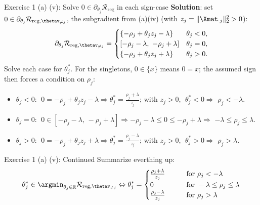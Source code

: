 \documentclass[aspectratio=169]{beamer}
\begin{document}
\begin{frame}{Exercise 1 (a) (v): Solve $0 \in \partial_{\theta_j}\mathcal{R}_{\text{reg}}$ in each sign-case}
	\small
	\textbf{Solution}: set $0 \in \partial_{\theta_j}\mathcal{R}_{\text{reg},\thetav_{\neq j}}$, the subgradient from (a)(iv) (with $z_j=\|\Xmat_{\cdot j}\|_2^2>0$):
	\[ \partial_{\theta_j}\mathcal{R}_{\text{reg},\thetav_{\neq j}} = \begin{cases}
		\{-\rho_j+\theta_j z_j-\lambda\} & \theta_j<0, \\
		[-\rho_j-\lambda,\ -\rho_j+\lambda] & \theta_j=0, \\
		\{-\rho_j+\theta_j z_j+\lambda\} & \theta_j>0.
	\end{cases} \]
	Solve each case for $\theta_j^*$. For the singletons, $0\in\{x\}$ means $0=x$; the assumed sign then forces a condition on $\rho_j$:
	\begin{itemize}
		\item<2-> $\theta_j<0$: $\;0 = -\rho_j+\theta_j z_j-\lambda \Rightarrow \theta_j^*=\tfrac{\rho_j+\lambda}{z_j}$; with $z_j>0$, $\;\theta_j^*<0 \Rightarrow$ \colorbox{blue!10}{$\rho_j<-\lambda$}.
		\item<3-> $\theta_j=0$: $\;0\in[-\rho_j-\lambda,\,-\rho_j+\lambda] \Rightarrow -\rho_j-\lambda\le0\le-\rho_j+\lambda \Rightarrow$ \colorbox{blue!10}{$-\lambda\le\rho_j\le\lambda$}.
		\item<4-> $\theta_j>0$: $\;0 = -\rho_j+\theta_j z_j+\lambda \Rightarrow \theta_j^*=\tfrac{\rho_j-\lambda}{z_j}$; with $z_j>0$, $\;\theta_j^*>0 \Rightarrow$ \colorbox{blue!10}{$\rho_j>\lambda$}.
	\end{itemize}
	
\end{frame}

\begin{frame}{Exercise 1 (a) (v): Continued}
	Summarize everthing up:
	$$\theta_j^* \in \argmin_{\theta_j \in \mathbb{R}} \mathcal{R}_{\text{reg}, \thetav_{\neq j}} \Leftrightarrow \theta_j^* = 
		\begin{cases}
			\frac{\rho_j + \lambda}{z_j} \qquad & \text{for } \rho_j < - \lambda \\
			0 \qquad & \text{for } - \lambda \leq \rho_j \leq \lambda \\
			\frac{\rho_j - \lambda}{z_j} \qquad & \text{for } \rho_j > \lambda  
		\end{cases}
	$$
\end{frame}
\end{document}

